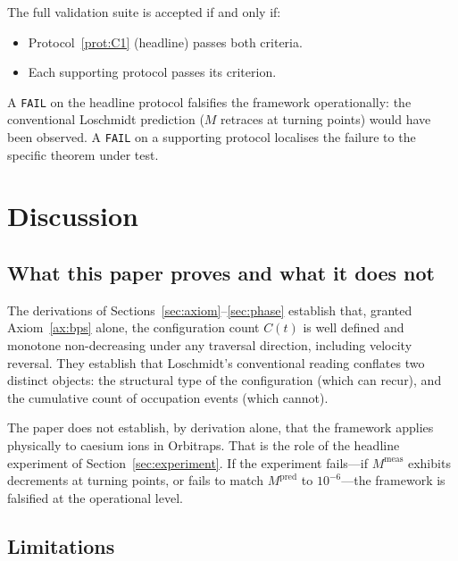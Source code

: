 \documentclass[twocolumn,10pt,a4paper]{article}
\theoremstyle{thmstyle}
\theoremstyle{definition}
\theoremstyle{remark}
\begin{document}
The full validation suite is accepted if and only if:
\begin{itemize}[nosep,leftmargin=*]
\item Protocol~\ref{prot:C1} (headline) passes both criteria.
\item Each supporting protocol passes its criterion.
\end{itemize}

A \texttt{FAIL} on the headline protocol falsifies the framework
operationally: the conventional Loschmidt prediction
($M$ retraces at turning points) would have been observed. A
\texttt{FAIL} on a supporting protocol localises the failure to the
specific theorem under test.

\section{Discussion}
\label{sec:discussion}

\subsection{What this paper proves and what it does not}

The derivations of Sections~\ref{sec:axiom}--\ref{sec:phase} establish
that, granted Axiom~\ref{ax:bps} alone, the configuration count
$C(t)$ is well defined and monotone non-decreasing under any
traversal direction, including velocity reversal. They establish that
Loschmidt's conventional reading conflates two distinct objects:
the structural type of the configuration (which can recur), and the
cumulative count of occupation events (which cannot).

The paper does not establish, by derivation alone, that the framework
applies physically to caesium ions in Orbitraps. That is the role of
the headline experiment of Section~\ref{sec:experiment}. If the
experiment fails---if $M^{\mathrm{meas}}$ exhibits decrements at
turning points, or fails to match $M^{\mathrm{pred}}$ to $10^{-6}$---the
framework is falsified at the operational level.

\subsection{Limitations}
\end{document}
